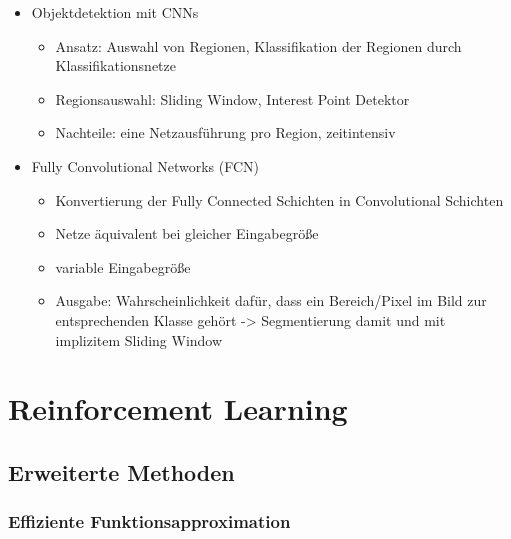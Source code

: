 \documentclass[paper=a4, fontsize=11pt]{scrartcl} %
\numberwithin{equation}{section} %
\numberwithin{figure}{section} %
\numberwithin{table}{section} %
\begin{document}
\begin{itemize}
\begin{itemize}
\end{itemize}
\item Objektdetektion mit CNNs
\begin{itemize}
\item Ansatz: Auswahl von Regionen, Klassifikation der Regionen durch Klassifikationsnetze
\item Regionsauswahl: Sliding Window, Interest Point Detektor
\item Nachteile: eine Netzausführung pro Region, zeitintensiv
\end{itemize}
\item Fully Convolutional Networks (FCN)
\begin{itemize}
\item Konvertierung der Fully Connected Schichten in Convolutional Schichten
\item Netze äquivalent bei gleicher Eingabegröße
\item variable Eingabegröße
\item Ausgabe: Wahrscheinlichkeit dafür, dass ein Bereich/Pixel im Bild zur entsprechenden Klasse gehört -> Segmentierung damit und mit implizitem Sliding Window
\end{itemize}
\end{itemize}

\section{Reinforcement Learning}

\subsection{Erweiterte Methoden}

\subsubsection{Effiziente Funktionsapproximation}
\end{document}
